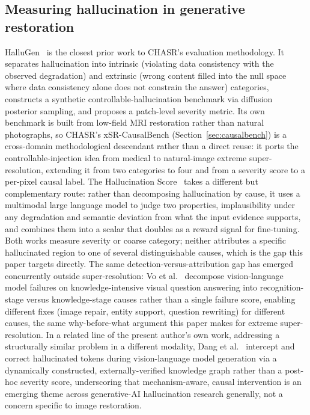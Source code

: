 \documentclass[review]{elsarticle}
\begin{document}
\subsection{Measuring hallucination in generative restoration}

HalluGen~\citep{kim2025hallugen} is the closest prior work to CHASR's evaluation methodology. It separates hallucination into intrinsic (violating data consistency with the observed degradation) and extrinsic (wrong content filled into the null space where data consistency alone does not constrain the answer) categories, constructs a synthetic controllable-hallucination benchmark via diffusion posterior sampling, and proposes a patch-level severity metric. Its own benchmark is built from low-field MRI restoration rather than natural photographs, so CHASR's xSR-CausalBench (Section~\ref{sec:causalbench}) is a cross-domain methodological descendant rather than a direct reuse: it ports the controllable-injection idea from medical to natural-image extreme super-resolution, extending it from two categories to four and from a severity score to a per-pixel causal label. The Hallucination Score~\citep{ren2025hallucination} takes a different but complementary route: rather than decomposing hallucination by cause, it uses a multimodal large language model to judge two properties, implausibility under any degradation and semantic deviation from what the input evidence supports, and combines them into a scalar that doubles as a reward signal for fine-tuning. Both works measure severity or coarse category; neither attributes a specific hallucinated region to one of several distinguishable causes, which is the gap this paper targets directly. The same detection-versus-attribution gap has emerged concurrently outside super-resolution: Vo et al.~\citep{vo2026failing} decompose vision-language model failures on knowledge-intensive visual question answering into recognition-stage versus knowledge-stage causes rather than a single failure score, enabling different fixes (image repair, entity support, question rewriting) for different causes, the same why-before-what argument this paper makes for extreme super-resolution. In a related line of the present author's own work, addressing a structurally similar problem in a different modality, Dang et al.~\citep{dang2026cmvkgguard} intercept and correct hallucinated tokens during vision-language model generation via a dynamically constructed, externally-verified knowledge graph rather than a post-hoc severity score, underscoring that mechanism-aware, causal intervention is an emerging theme across generative-AI hallucination research generally, not a concern specific to image restoration.
\end{document}
